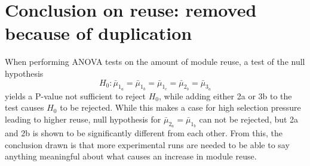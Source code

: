 \chapter{Conclusion on reuse: removed because of duplication}
When performing ANOVA tests on the amount of module reuse, a test of the null hypothesis
\begin{equation*}
    H_{0}:\bar{\mu}_{1_{a}}=\bar{\mu}_{1_{b}}=\bar{\mu}_{1_{c}}=\bar{\mu}_{2_{b}}=\bar{\mu}_{3_{a}}
\end{equation*}
yields a P-value not sufficient to reject \(H_{0}\), while adding either 2a or 3b to the test causes \(H_{0}\) to be rejected. While this makes a case for high selection pressure leading to higher reuse, null hypothesis for \(\bar{\mu}_{2_{a}}=\bar{\mu}_{1_{b}}\) can not be rejected, but 2a and 2b is shown to be significantly different from each other. From this, the conclusion drawn is that more experimental runs are needed to be able to say anything meaningful about what causes an increase in module reuse.